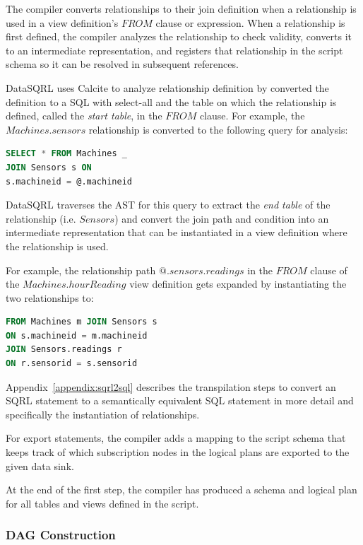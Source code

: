 \documentclass[	DIV=calc,%
							paper=letter,%
							fontsize=11pt,%
							twocolumn]{scrartcl}	 					%
\begin{document}
The compiler converts relationships to their join definition when a relationship is used in a view definition's $FROM$ clause or expression.
When a relationship is first defined, the compiler analyzes the relationship to check validity, converts it to an intermediate representation, and registers that relationship in the script schema so it can be resolved in subsequent references.

DataSQRL uses Calcite to analyze relationship definition by converted the definition to a SQL with select-all and the table on which the relationship is defined, called the \emph{start table}, in the $FROM$ clause. For example, the $Machines.sensors$ relationship is converted to the following query for analysis:
\begin{lstlisting}[language=SQL]
SELECT * FROM Machines _
JOIN Sensors s ON
s.machineid = @.machineid
\end{lstlisting}
DataSQRL traverses the AST for this query to extract the \emph{end table} of the relationship (i.e. $Sensors$) and convert the join path and condition into an intermediate representation that can be instantiated in a view definition where the relationship is used.

For example, the relationship path $@.sensors.readings$ in the $FROM$ clause of the $Machines.hourReading$ view definition gets expanded by instantiating the two relationships to:
\begin{lstlisting}[language=SQL]
FROM Machines m JOIN Sensors s
ON s.machineid = m.machineid
JOIN Sensors.readings r
ON r.sensorid = s.sensorid
\end{lstlisting}

Appendix~\ref{appendix:sqrl2sql} describes the transpilation steps to convert an SQRL statement to a semantically equivalent SQL statement in more detail and specifically the instantiation of relationships.

For export statements, the compiler adds a mapping to the script schema that keeps track of which subscription nodes in the logical plans are exported to the given data sink.

At the end of the first step, the compiler has produced a schema and logical plan for all tables and views defined in the script.

\subsubsection{DAG Construction}
\end{document}
